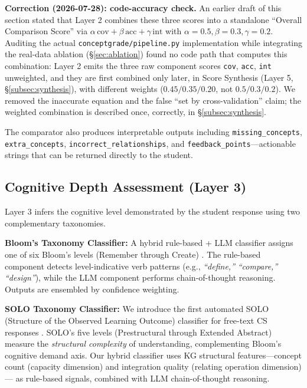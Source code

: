 \documentclass[conference]{IEEEtran}
\begin{document}
\textbf{Correction (2026-07-28): code-accuracy check.} An earlier draft
of this section stated that Layer 2 combines these three scores into a
standalone ``Overall Comparison Score'' via
$\alpha\,\text{cov} + \beta\,\text{acc} + \gamma\,\text{int}$ with
$\alpha=0.5,\beta=0.3,\gamma=0.2$. Auditing the actual
\texttt{conceptgrade/pipeline.py} implementation while integrating the
real-data ablation (\S\ref{sec:ablation}) found no code path that
computes this combination: Layer 2 emits the three raw component scores
\texttt{cov}, \texttt{acc}, \texttt{int} unweighted, and they are first
combined only later, in Score Synthesis (Layer 5,
\S\ref{subsec:synthesis}), with different weights
($0.45/0.35/0.20$, not $0.5/0.3/0.2$). We removed the inaccurate
equation and the false ``set by cross-validation'' claim; the weighted
combination is described once, correctly, in \S\ref{subsec:synthesis}.

The comparator also produces interpretable outputs including \texttt{missing\_concepts},
\texttt{extra\_concepts}, \texttt{incorrect\_relationships}, and
\texttt{feedback\_points}—actionable strings that can be returned directly to
the student.

\subsection{Cognitive Depth Assessment (Layer 3)}

Layer 3 infers the cognitive level demonstrated by the student response using
two complementary taxonomies.

\textbf{Bloom's Taxonomy Classifier:} A hybrid rule-based + LLM classifier
assigns one of six Bloom's levels (Remember through Create)
\cite{bloom1956,anderson2001}. The rule-based component detects level-indicative
verb patterns (e.g., \emph{``define,''} \emph{``compare,''} \emph{``design''}),
while the LLM component performs chain-of-thought reasoning. Outputs are ensembled
by confidence weighting.

\textbf{SOLO Taxonomy Classifier:} We introduce the first automated SOLO
(Structure of the Observed Learning Outcome) classifier for free-text CS responses
\cite{biggs1982}. SOLO's five levels (Prestructural through Extended Abstract)
measure the \emph{structural complexity} of understanding, complementing Bloom's
cognitive demand axis. Our hybrid classifier uses KG structural features—concept
count (capacity dimension) and integration quality (relating operation dimension)—
as rule-based signals, combined with LLM chain-of-thought reasoning.
\end{document}
